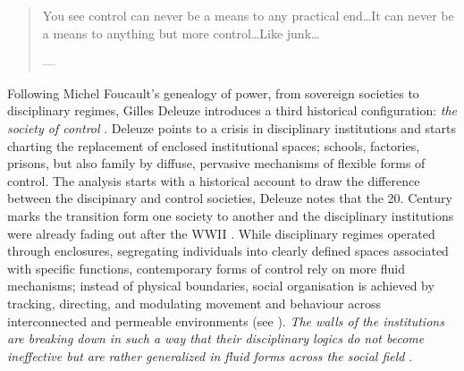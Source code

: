 


\begin{quote}
	You see control can never be a means to any practical end\ldots It can never be a means to anything but more control\ldots Like junk\ldots

	— \cite[81]{burroughs1979}
\end{quote}


Following Michel Foucault’s genealogy of power, from sovereign societies to disciplinary regimes, Gilles Deleuze introduces a third historical configuration: \textit{the society of control} \parencite[]{deleuze1992a} . Deleuze points to a crisis in disciplinary institutions and starts charting the replacement of enclosed institutional spaces; schools, factories, prisons, but also family  by diffuse, pervasive mechanisms of flexible forms of control. The analysis starts with a historical account to draw the difference between the discipinary and control societies, Deleuze notes that the 20. Century marks the transition form one society to another and the disciplinary institutions were already fading out after the WWII \parencite[3]{deleuze1992a}.
While disciplinary regimes operated through enclosures, segregating individuals into clearly defined spaces associated with specific functions, contemporary forms of control rely on more fluid mechanisms; instead of physical boundaries, social organisation is achieved by tracking, directing, and modulating movement and behaviour across interconnected and permeable environments (see \cite[3]{brusseau2020}). \textit{The walls of the institutions are breaking down in such a way that their  disciplinary logics do not become ineffective but are rather generalized in fluid  forms across the social field} \parencite[139]{hardt1998}.


